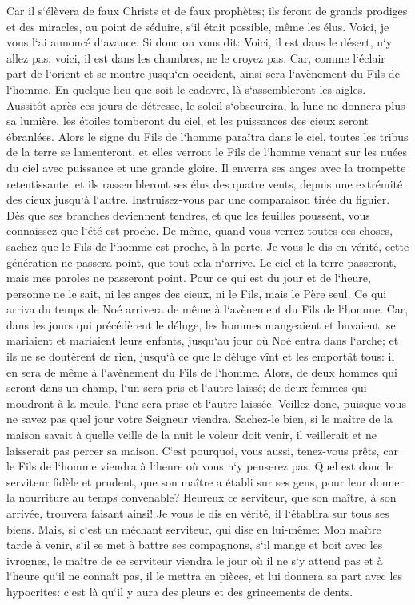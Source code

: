 \verse Car il s`élèvera de faux Christs et de faux prophètes; ils feront de grands prodiges et des miracles, au point de séduire, s`il était possible, même les élus. 
\verse Voici, je vous l`ai annoncé d`avance. 
\verse Si donc on vous dit: Voici, il est dans le désert, n`y allez pas; voici, il est dans les chambres, ne le croyez pas. 
\verse Car, comme l`éclair part de l`orient et se montre jusqu`en occident, ainsi sera l`avènement du Fils de l`homme. 
\verse En quelque lieu que soit le cadavre, là s`assembleront les aigles. 
\verse Aussitôt après ces jours de détresse, le soleil s`obscurcira, la lune ne donnera plus sa lumière, les étoiles tomberont du ciel, et les puissances des cieux seront ébranlées. 
\verse Alors le signe du Fils de l`homme paraîtra dans le ciel, toutes les tribus de la terre se lamenteront, et elles verront le Fils de l`homme venant sur les nuées du ciel avec puissance et une grande gloire. 
\verse Il enverra ses anges avec la trompette retentissante, et ils rassembleront ses élus des quatre vents, depuis une extrémité des cieux jusqu`à l`autre. 
\verse Instruisez-vous par une comparaison tirée du figuier. Dès que ses branches deviennent tendres, et que les feuilles poussent, vous connaissez que l`été est proche. 
\verse De même, quand vous verrez toutes ces choses, sachez que le Fils de l`homme est proche, à la porte. 
\verse Je vous le dis en vérité, cette génération ne passera point, que tout cela n`arrive. 
\verse Le ciel et la terre passeront, mais mes paroles ne passeront point. 
\verse Pour ce qui est du jour et de l`heure, personne ne le sait, ni les anges des cieux, ni le Fils, mais le Père seul. 
\verse Ce qui arriva du temps de Noé arrivera de même à l`avènement du Fils de l`homme. 
\verse Car, dans les jours qui précédèrent le déluge, les hommes mangeaient et buvaient, se mariaient et mariaient leurs enfants, jusqu`au jour où Noé entra dans l`arche; 
\verse et ils ne se doutèrent de rien, jusqu`à ce que le déluge vînt et les emportât tous: il en sera de même à l`avènement du Fils de l`homme. 
\verse Alors, de deux hommes qui seront dans un champ, l`un sera pris et l`autre laissé; 
\verse de deux femmes qui moudront à la meule, l`une sera prise et l`autre laissée. 
\verse Veillez donc, puisque vous ne savez pas quel jour votre Seigneur viendra. 
\verse Sachez-le bien, si le maître de la maison savait à quelle veille de la nuit le voleur doit venir, il veillerait et ne laisserait pas percer sa maison. 
\verse C`est pourquoi, vous aussi, tenez-vous prêts, car le Fils de l`homme viendra à l`heure où vous n`y penserez pas. 
\verse Quel est donc le serviteur fidèle et prudent, que son maître a établi sur ses gens, pour leur donner la nourriture au temps convenable? 
\verse Heureux ce serviteur, que son maître, à son arrivée, trouvera faisant ainsi! 
\verse Je vous le dis en vérité, il l`établira sur tous ses biens. 
\verse Mais, si c`est un méchant serviteur, qui dise en lui-même: Mon maître tarde à venir, 
\verse s`il se met à battre ses compagnons, s`il mange et boit avec les ivrognes, 
\verse le maître de ce serviteur viendra le jour où il ne s`y attend pas et à l`heure qu`il ne connaît pas, 
\verse il le mettra en pièces, et lui donnera sa part avec les hypocrites: c`est là qu`il y aura des pleurs et des grincements de dents. 

